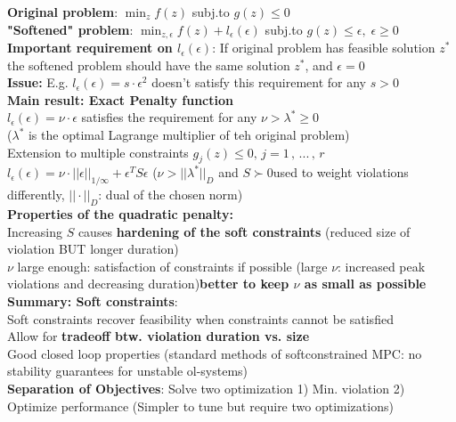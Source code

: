     \textbf{Original problem}: $\min_zf(z)$\quad
    subj.to $g(z)\leq0$\\
    \textbf{"Softened" problem}: $\min_{z,\epsilon}f(z)+l_\epsilon(\epsilon)$\quad
    subj.to $g(z)\leq \epsilon,\;\epsilon\geq0$\\
    \textbf{Important requirement on $l_\epsilon(\epsilon)$}:
    If original problem has feasible solution $z^*$\\\rightarrow the softened problem should have the same solution $z^*$, and $\epsilon=0$\\
    \textbf{Issue:} E.g. $l_\epsilon(\epsilon)=s\cdot\epsilon^2$ doesn't satisfy this requirement for any $s>0$\\
    \textbf{Main result: Exact Penalty function}\\
    $l_\epsilon(\epsilon)=\nu\cdot\epsilon$ satisfies the requirement for any $\nu>\lambda^*\geq0$ \\($\lambda^*$ is the optimal Lagrange multiplier of teh original problem)\\
    Extension to multiple constraints $g_j(z)\leq0,\,j=1\,,\,...\,,\,r$\\
    $l_\epsilon(\epsilon)=\nu\cdot||\epsilon||_{1/\infty}+\epsilon^TS\epsilon$ ($\nu>||\lambda^*||_D$ and $S\succ0$\rightarrow used to weight violations differently, $||\cdot||_D$: dual of the chosen norm)\\
    \textbf{Properties of the quadratic penalty:}\\
    \rightarrow Increasing $S$ causes \textbf{hardening of the soft constraints} (reduced size of violation BUT longer duration)\\
    \rightarrow $\nu$ large enough: satisfaction of constraints if possible (large $\nu$: increased peak violations and decreasing duration)\rightarrow \textbf{better to keep $\nu$ as small as possible}\\
    \textbf{Summary: Soft constraints}:\\
    \rightarrow Soft constraints recover feasibility when constraints cannot be satisfied\\
    \rightarrow Allow for \textbf{tradeoff btw. violation duration vs. size} \\
    \rightarrow Good closed loop properties  (standard methods of softconstrained MPC: no stability guarantees for unstable ol-systems)\\
    \rightarrow \textbf{Separation of Objectives}: Solve two optimization 1) Min. violation 2) Optimize performance (Simpler to tune but require two optimizations)